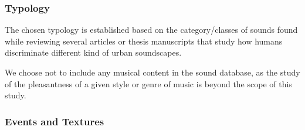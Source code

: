 \documentclass[12pt]{elsarticle}
\newcommand{\etc}{\emph{etc.}}
\begin{document}
\subsubsection*{Typology}


The chosen typology is established based on the category/classes of sounds found while reviewing several articles or thesis manuscripts \cite{maffiolo_caracterisation_1999,raimbault2002simulation,guastavino_etude_2003,defreville2004aactivity,raimbault2005urban,dubois2006cognitive,devergie_relations_2006,guastavino2006ideal,niessen2010categories,maffiolo_caracterisation_1999,beaumont2004pertinence,polack2008perceptive,leobon_analyse_1986,brown2011towards} that study how humans discriminate different kind of urban soundscapes.


We choose not to include any musical content in the sound database, as the study of the pleasantness of a given style or genre of music is beyond the scope of this study.

\subsubsection*{Events and Textures}

\end{document}
